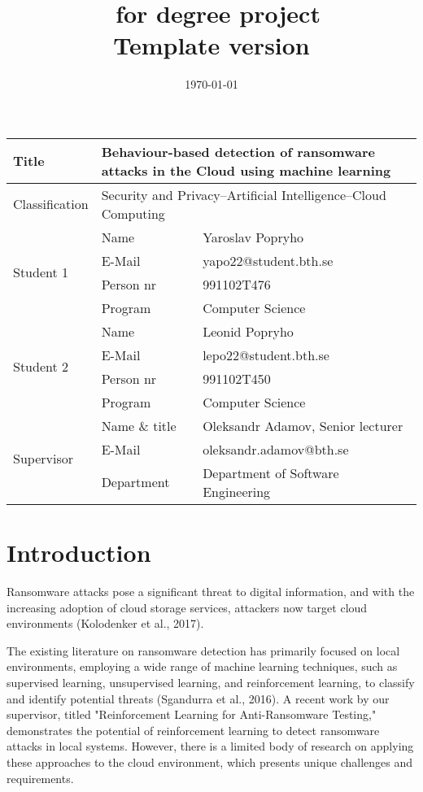 \documentclass[12pt,a4paper,twoside]{article}
\title{\thePurpose\ for degree project\\\vspace{1mm}\small{Template version \theVersion}}
\author{\textsc{\theCourse}}
\date{\today}
\begin{document}
\maketitle
\vspace*{-5mm}

\noindent %
\begin{tabular}{|l|l|p{9.3cm}|}
\hline
Title      		  & \multicolumn{2}{|p{12cm}|}{Behaviour-based detection of ransomware attacks in the Cloud using machine learning} \\
\hline
Classification      		  & \multicolumn{2}{|l|}{Security and Privacy--Artificial Intelligence--Cloud Computing} \\
\hline\hline
\multirow{4}{*}{Student 1}
 & Name           & Yaroslav Popryho\\\cline{2-3}
 & E-Mail         & yapo22@student.bth.se \\\cline{2-3}
 & Person nr      & 991102T476 \\\cline{2-3}
 & Program        & Computer Science \\\cline{2-3}
\hline
\multirow{4}{*}{Student 2}
 & Name           & Leonid Popryho\\\cline{2-3}
 & E-Mail         & lepo22@student.bth.se \\\cline{2-3}
 & Person nr      & 991102T450 \\\cline{2-3}
 & Program        & Computer Science \\\cline{2-3}
\hline
\multirow{3}{*}{Supervisor}
 & Name \& title  & Oleksandr Adamov, Senior lecturer \\\cline{2-3}
 & E-Mail         &  oleksandr.adamov@bth.se \\\cline{2-3}
 & Department     &  Department of Software Engineering \\
\hline

\end{tabular}


\section{Introduction}
\label{sec:intro}
Ransomware attacks pose a significant threat to digital information, and with the increasing adoption of cloud storage services, attackers now target cloud environments (Kolodenker et al., 2017). \cite{kolodenker2017ezdec}

The existing literature on ransomware detection has primarily focused on local environments, employing a wide range of machine learning techniques, such as supervised learning, unsupervised learning, and reinforcement learning, to classify and identify potential threats (Sgandurra et al., 2016). \cite{sgandurra2016automated} A recent work by our supervisor, titled "Reinforcement Learning for Anti-Ransomware Testing," \cite{Adamov} demonstrates the potential of reinforcement learning to detect ransomware attacks in local systems. However, there is a limited body of research on applying these approaches to the cloud environment, which presents unique challenges and requirements.
\end{document}

